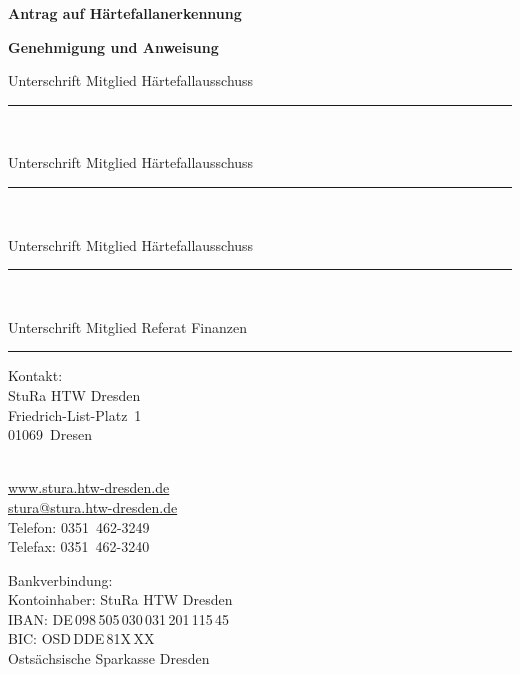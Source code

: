 \documentclass[%
	ngerman,	%
	parskip=half,
	paper=a4,%
	pagesize=auto	%
	]{scrartcl}
\newenvironment{InfoBlock}[1]{%
%
	\par\vspace{1em}\noindent\textbf{\textsf{\large#1}}\par\noindent%
		\begin{lrbox}{\InfoBlockBox}%
		\begin{minipage}{\dimexpr\linewidth-2\fboxrule-2\fboxsep}%
	}{%
		\end{minipage}%
		\end{lrbox}
		\fbox{\usebox{\InfoBlockBox}}%
	}
\newcommand{\Logo}{%
	./img/stura_logo.pdf%
}
\begin{document}
\newpage

	\parbox{\dimexpr\textwidth-3cm}{%
		\noindent%
	\textbf{\huge Antrag auf Härtefallanerkennung}}%
\hfill
\parbox{3cm}{%
}

\vspace{-8.0mm}
\begin{InfoBlock}{Genehmigung und Anweisung}
	\parbox{.39\textwidth}{Unterschrift Mitglied Härtefallausschuss} \rule{5cm}{.4pt}\\%
	\parbox{.39\textwidth}{Unterschrift Mitglied Härtefallausschuss} \rule{5cm}{.4pt}\\%
	\parbox{.39\textwidth}{Unterschrift Mitglied Härtefallausschuss} \rule{5cm}{.4pt}\\%
	\parbox{.39\textwidth}{Unterschrift Mitglied Referat Finanzen} \rule{5cm}{.4pt}%
\end{InfoBlock}

\vfill
\noindent
\parbox{.3\linewidth}{
Kontakt:\\
StuRa HTW Dresden\\
Friedrich-List-Platz~1\\
01069~Dresen\\
\hspace{0em}
}
\hfill
\parbox{.3\linewidth}{
\hspace{0em}\\
\href{http://www.stura.htw-dresden.de}{www.stura.htw-dresden.de}\\
\href{mailto:stura@stura.htw-dresden.de}{stura@stura.htw-dresden.de}\\
Telefon: 0351~462-3249\\
Telefax: 0351~462-3240\\
\hspace{0em}
}
\hfill
\parbox{.3\linewidth}{
Bankverbindung:\\
Kontoinhaber: StuRa HTW Dresden\\
IBAN: DE\,098\,505\,030\,031\,201\,115\,45\\
BIC: OSD\,DDE\,81X\,XX\\
Ostsächsische Sparkasse Dresden
}
\end{document}
